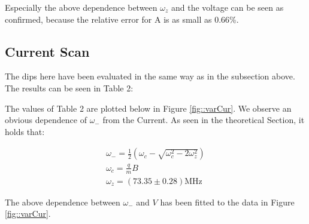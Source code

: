 \documentclass[12pt]{article}
\begin{document}
Especially the above dependence between $\omega_z$ and the voltage can be seen as confirmed, because the relative error for A is as small as 0.66\%.

\subsection{Current Scan}

The dips here have been evaluated in the same way as in the subsection above. The results can be seen in Table 2:


The values of Table 2 are plotted below in Figure \eqref{fig::varCur}. We observe an obvious dependence of $\omega_-$ from the Current. As seen in the theoretical Section, it holds that:

\begin{equation*}
\begin{aligned}
\omega_- = \frac{1}{2}(\omega_c - \sqrt{\omega_c^2 - 2\omega_z^2}) \\
\omega_c = \frac{q}{m}B \\
\omega_z = (73.35 \pm 0.28) \text{MHz}
\end{aligned}
\end{equation*}

The above dependence between $\omega_-$ and $V$ has been fitted to the data in Figure \eqref{fig::varCur}.
\end{document}
